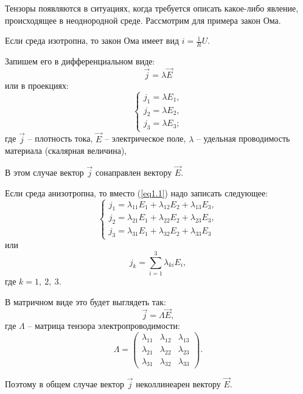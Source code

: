     Тензоры появляются в ситуациях, когда требуется описать какое-либо явление, происходящее в неоднородной среде. Рассмотрим для примера закон Ома.
    
    Если среда изотропна, то закон Ома имеет вид \( i = \frac{1}{R} U \).
    
    Запишем его в дифференциальном виде:
    \[ \vec{j} = \lambda \vec{E} \]
    или в проекциях: 
    \begin{equation}
    \left\{ \begin{array}{l}
            j_{1} = \lambda E_{1}, \\
            j_{2} = \lambda E_{2}, \\
            j_{3} = \lambda E_{3};
    \end{array} \right. \label{eq1.1}
    \end{equation}
    где \( \vec{j} \) -- плотность тока, \( \vec{E} \) -- электрическое поле, \( \lambda \) -- удельная проводимость материала (скалярная величина),

    В этом случае вектор \( \vec{j} \) сонаправлен вектору \( \vec{E} \).

    Если среда анизотропна, то вместо (\ref{eq1.1}) надо записать следующее:
    \begin{equation}
        \left\{
        \begin{array}{c}
            j_{1} = \lambda_{11} E_{1} + \lambda_{12} E_{2} + \lambda_{13} E_{3}, \\
            j_{2} = \lambda_{21} E_{1} + \lambda_{22} E_{2} + \lambda_{23} E_{3}, \\
            j_{3} = \lambda_{31} E_{1} + \lambda_{32} E_{2} + \lambda_{33} E_{3}
        \end{array}
        \right.
    \end{equation}
    или 
    \[ j_{k} = \sum\limits_{i=1}^3 \lambda_{ki} E_i, \]
    где \( k = 1,\ 2,\ 3 \).
    
    В матричном виде это будет выглядеть так:
    \[ \vec{j} = \Lambda \vec{E}, \]
    где \( \Lambda \) -- матрица тензора электропроводимости:
    \[ \Lambda =
        \begin{pmatrix}
            \lambda_{11} & \lambda_{12} & \lambda_{13} \\
            \lambda_{21} & \lambda_{22} & \lambda_{23} \\
            \lambda_{31} & \lambda_{32} & \lambda_{33} 
        \end{pmatrix}. \]

    Поэтому в общем случае вектор \( \vec{j} \) неколлинеарен вектору \( \vec{E} \).

